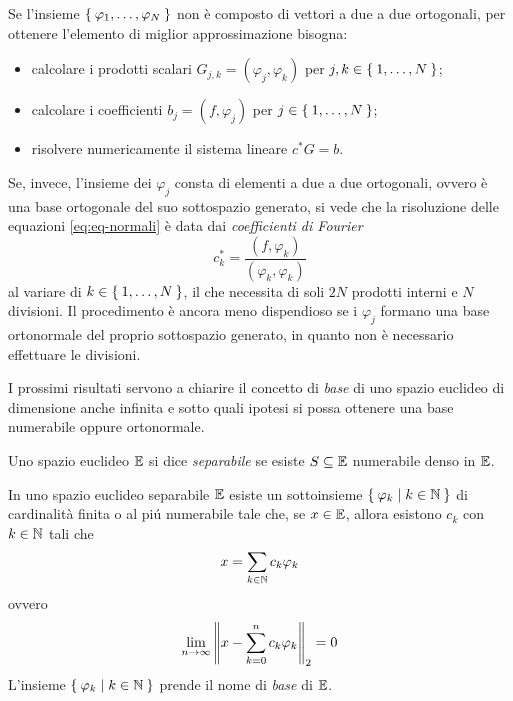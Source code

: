 	\begin{osservazione}
		Se l'insieme \(\Set{\varphi_1, \dots, \varphi_N}\) non è composto di vettori a due a due ortogonali, per ottenere l'elemento di miglior approssimazione bisogna:
		\begin{itemize}
			\item calcolare i prodotti scalari \(G_{j, k} = (\varphi_j, \varphi_k)\) per \(j, k \in \Set{1, \dots, N}\);
			\item calcolare i coefficienti \(b_j = (f, \varphi_j)\) per \(j \in \Set{1, \dots, N}\);
			\item risolvere numericamente il sistema lineare \(c^* G = b\).
		\end{itemize}
		Se, invece, l'insieme dei \(\varphi_j\) consta di elementi a due a due ortogonali, ovvero è una base ortogonale del suo sottospazio generato, si vede che la risoluzione delle equazioni \eqref{eq:eq-normali} è data dai \emph{coefficienti di Fourier}
		\begin{equation}\label{eq:coeff-fourier}
			c_k^* = \frac{(f, \varphi_k)}{(\varphi_k, \varphi_k)}
		\end{equation}
		al variare di \(k \in \Set{1, \dots, N}\), il che necessita di soli \(2 N\) prodotti interni e \(N\) divisioni. Il procedimento è ancora meno dispendioso se i \(\varphi_j\) formano una base ortonormale del proprio sottospazio generato, in quanto non è necessario effettuare le divisioni.
	\end{osservazione}

	I prossimi risultati servono a chiarire il concetto di \emph{base} di uno spazio euclideo di dimensione anche infinita e sotto quali ipotesi si possa ottenere una base numerabile oppure ortonormale.
	
	\begin{definizione}
		Uno spazio euclideo \(\mathbb{E}\) si dice \emph{separabile} se esiste \(S \subseteq \mathbb{E}\) numerabile denso in \(\mathbb{E}\).
	\end{definizione}

	\begin{teorema}\label{th:base-sp-euclideo-separabile}
		In uno spazio euclideo separabile \(\mathbb{E}\) esiste un sottoinsieme \(\Set{\varphi_k | k \in \mathbb{N}}\) di cardinalità finita o al piú numerabile tale che, se \(x \in \mathbb{E}\), allora esistono \(c_k\) con \(k \in \mathbb{N}\) tali che
		\begin{equation*}
			x = \sum_{k \in \mathbb{N}} c_k \varphi_k
		\end{equation*}
		ovvero
		\begin{equation*}
			\lim_{n \to \infty} \norm{x - \sum_{k = 0}^n c_k \varphi_k}_2 = 0
		\end{equation*}
		L'insieme \(\Set{\varphi_k | k \in \mathbb{N}}\) prende il nome di \emph{base} di \(\mathbb{E}\).
	\end{teorema}

